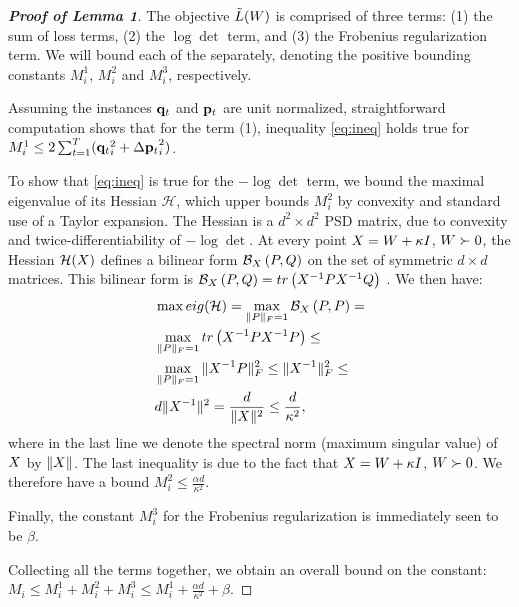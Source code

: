 \documentclass{article}
\begin{document}
\begin{proof}[\bf{Proof of Lemma 1}]
The objective $\tilde{L}({W})$ is comprised of three terms: (1) the sum of loss terms, (2) the $\log \det$ term, and (3) the Frobenius regularization term. We will bound each of the separately, denoting the positive bounding constants $M^1_i$, $M^2_i$ and $M^3_i$, respectively.  

Assuming the instances ${{\mathbf{q}}_{{t}}}$ and ${{\mathbf{p}}_{{t}}}$ are unit normalized, straightforward computation shows that for the term (1), inequality \ref{eq:ineq} holds true for $M^1_i \leq 2 \sum_{t=1}^T ({{\mathbf{q}}_{{t}}}_i^2 +{\Delta\mathbf{p}_{t}}_i^2)$. %

To show that \ref{eq:ineq} is true for the $- \log \det$ term, we bound the maximal eigenvalue of its Hessian $\mathcal{H}$, which upper bounds $M_i^2$ by convexity and standard use of a Taylor expansion.
The Hessian is a $d^2 \times d^2$ PSD matrix, due to convexity and twice-differentiability of $- \log \det$. At every point ${X} = {W} + \kappa I$, ${W} \succ 0$, the Hessian $\mathcal{H}({X})$ defines a bilinear form $\mathcal{B}_{{X}}\left({P},{Q}\right)$ on the set of symmetric $d \times d$ matrices. This bilinear form is  $\mathcal{B}_{{X}}\left({P},{Q}\right) = tr\left({X}^{-1}{P} {X}^{-1}{Q}\right)$ \citep[Appendix A]{boyd2004convex}. We then have:
\begin{align*}
&\max eig(\mathcal{H}) = \max_{\|{P}\|_F=1} \mathcal{B}_{{X}}\left({P},{P}\right) = \\
&\max_{\|{P}\|_F=1} tr\left({X}^{-1}{P} {X}^{-1}{P}\right) \leq \\
&\max_{\|{P}\|_F=1} \|{X}^{-1} {P}\|_F^2 \leq \|{X}^{-1}\|_F^2 \leq  \\
& d \|{X}^{-1}\|^2 = \frac{d}{\|{X}\|^2} \leq \frac{d}{\kappa^2},
\end{align*}
where in the last line we denote the spectral norm (maximum singular value) of ${X}$ by $\|{X}\|$. The last inequality is due to the fact that ${X} = {W} + \kappa I$, ${W} \succ 0$.
We therefore have a bound $M^2_i \leq \frac{\alpha d}{\kappa^2}$.

Finally, the constant $M^3_{i}$ for the Frobenius regularization is immediately seen to be $\beta$.

Collecting all the terms together, we obtain an overall bound on the constant: $M_i \leq M^1_{i} + M^2_{i} + M^3_{i} \leq  M^1_{i} + \frac{\alpha d}{\kappa ^2} + \beta$.
\end{proof}
\end{document}
